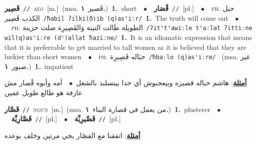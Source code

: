 \documentclass[10pt,a4paper,twoside]{article} %
\begin{document}
\begin{multicols}{2}
{\setlength\topsep{0pt}\textbf{\foreignlanguage{arabic}{قَصِير}}\ {\color{gray}\texttt{//}\color{black}}\ \textsc{adj}\ [m.]\ \color{gray}(msa. \foreignlanguage{arabic}{قَصير}~\foreignlanguage{arabic}{\textbf{١.}})\color{black}\ \textbf{1.}~short\ \ $\bullet$\ \ \setlength\topsep{0pt}\textbf{\foreignlanguage{arabic}{قْصَار}}\ {\color{gray}\texttt{//}\color{black}}\ [pl.]\ \ $\bullet$\ \ \textsc{ph.} \color{gray} \foreignlanguage{arabic}{حبل الكذب قَصِير}\color{black}\ {\color{gray}\texttt{/{\sffamily ħabil ʔilki(ð)ib (q)asˤiːr}/}\color{black}}\ \textbf{1.}~The truth will come out\ \ $\bullet$\ \ \textsc{ph.} \color{gray} \foreignlanguage{arabic}{الطويلة طَالت التينة وَالقَصِيرِة ضلت حزينة}\color{black}\ {\color{gray}\texttt{/{\sffamily ʔitˤtˤawiːle tˤaːlat ʔittiːne wil(q)asˤiːre (dˤ)allat ħaziːne}/}\color{black}}\ \textbf{1.}~It is an idiomatic expression that means that it is preferrable to get married to tall women as it is believed that they are luckier than short women\ \ $\bullet$\ \ \textsc{ph.} \color{gray} \foreignlanguage{arabic}{حبَاله قَصِيرِة}\color{black}\ {\color{gray}\texttt{/{\sffamily ħbaːlo (q)asˤiːre}/}\color{black}}\ \color{gray} (msa. \foreignlanguage{arabic}{غير صبور}~\foreignlanguage{arabic}{\textbf{١.}})\color{black}\ \textbf{1.}~impatient\  \begin{flushright}\color{gray}\foreignlanguage{arabic}{\textbf{\underline{\foreignlanguage{arabic}{أمثلة}}}: هاشم حباله قصيره وبيعجبوش أي حدا بيتسلبد بالشغل\ $\bullet$\ \  أمه وأبوه قْصار مش عارفة هو طالع طويل عمين}\end{flushright}\color{black}} \vspace{2mm}

{\setlength\topsep{0pt}\textbf{\foreignlanguage{arabic}{قَصَّار}}\ {\color{gray}\texttt{//}\color{black}}\ \textsc{noun}\ [m.]\ \color{gray}(msa. \foreignlanguage{arabic}{من يعمل في قصارة البناء}~\foreignlanguage{arabic}{\textbf{١.}})\color{black}\ \textbf{1.}~plasterer\ \ $\bullet$\ \ \setlength\topsep{0pt}\textbf{\foreignlanguage{arabic}{قَصَّارِيِّة}}\ {\color{gray}\texttt{//}\color{black}}\ [pl.]\ \ $\bullet$\ \ \setlength\topsep{0pt}\textbf{\foreignlanguage{arabic}{قَصِّيرِيِّة}}\ {\color{gray}\texttt{//}\color{black}}\ [pl.]\  \begin{flushright}\color{gray}\foreignlanguage{arabic}{\textbf{\underline{\foreignlanguage{arabic}{أمثلة}}}: اتفقنا مع القصّار يجي مرتين وخلف بوعده}\end{flushright}\color{black}} \vspace{2mm}


\end{multicols}
\end{document}
